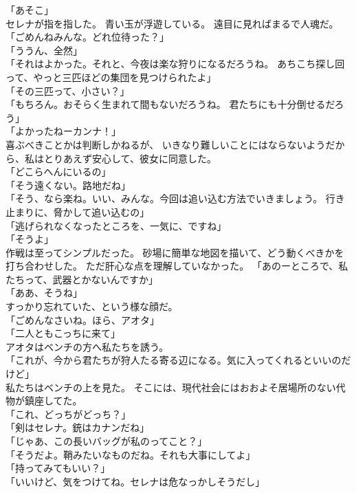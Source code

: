 \documentclass[../IHMain]{subfiles}
\begin{document}
「あそこ」\\
セレナが指を指した。
青い玉が浮遊している。
遠目に見ればまるで人魂だ。\\
「ごめんねみんな。どれ位待った？」\\
「ううん、全然」\\
「それはよかった。それと、今夜は楽な狩りになるだろうね。
あちこち探し回って、やっと三匹ほどの集団を見つけられたよ」\\
「その三匹って、小さい？」\\
「もちろん。おそらく生まれて間もないだろうね。
君たちにも十分倒せるだろう」\\
「よかったねーカンナ！」\\
喜ぶべきことかは判断しかねるが、
いきなり難しいことにはならないようだから、私はとりあえず安心して、彼女に同意した。\\
「どこらへんにいるの」\\
「そう遠くない。路地だね」\\
「そう、なら楽ね。いい、みんな。今回は追い込む方法でいきましょう。
行き止まりに、脅かして追い込むの」\\
「逃げられなくなったところを、一気に、ですね」\\
「そうよ」\\
作戦は至ってシンプルだった。
砂場に簡単な地図を描いて、どう動くべきかを打ち合わせした。
ただ肝心な点を理解していなかった。
「あのーところで、私たちって、武器とかないんですか」\\
「ああ、そうね」\\
すっかり忘れていた、という様な顔だ。\\
「ごめんなさいね。ほら、アオタ」\\
「二人ともこっちに来て」\\
アオタはベンチの方へ私たちを誘う。\\
「これが、今から君たちが狩人たる寄る辺になる。気に入ってくれるといいのだけど」\\
私たちはベンチの上を見た。
そこには、現代社会にはおおよそ居場所のない代物が鎮座してた。\\
「これ、どっちがどっち？」\\
「剣はセレナ。銃はカナンだね」\\
「じゃあ、この長いバッグが私のってこと？」\\
「そうだよ。鞘みたいなものだね。それも大事にしてよ」\\
「持ってみてもいい？」\\
「いいけど、気をつけてね。セレナは危なっかしそうだし」\\
\end{document}
